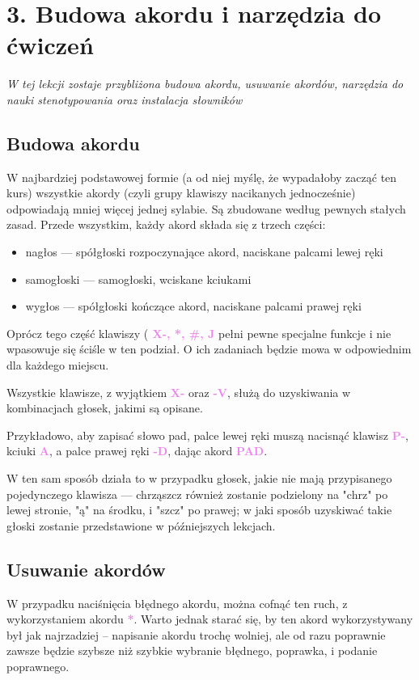 \documentclass[12p, oneside]{book}
\newcommand{\steno}[1]{\textbf{\textsf{\textcolor{violet}{ #1}}}}
\begin{document}
\section{3. Budowa akordu i narzędzia do ćwiczeń}

\emph{W tej lekcji zostaje przybliżona budowa akordu, usuwanie akordów, narzędzia do nauki stenotypowania oraz instalacja słowników}

\subsection*{Budowa akordu}
W najbardziej podstawowej formie (a od niej myślę, że wypadałoby zacząć ten kurs) wszystkie akordy (czyli grupy klawiszy nacikanych jednocześnie) odpowiadają mniej więcej jednej sylabie. Są zbudowane według pewnych stałych zasad. Przede wszystkim, każdy akord składa się z trzech części:
\begin{itemize}
	\item nagłos --- spółgłoski rozpoczynające akord, naciskane palcami lewej ręki
	\item samogłoski --- samogłoski, wciskane kciukami
	\item wygłos --- spółgłoski kończące akord, naciskane palcami prawej ręki
\end{itemize}
Oprócz tego część klawiszy (\steno{X-, *, \#, J} pełni pewne specjalne funkcje i nie wpasowuje się ściśle w ten podział. O ich zadaniach będzie mowa w odpowiednim dla każdego miejscu.

Wszystkie klawisze, z wyjątkiem \steno{X-} oraz \steno{-V}, służą do uzyskiwania w kombinacjach głosek, jakimi są opisane.

Przykładowo, aby zapisać słowo pad, palce lewej ręki muszą nacisnąć klawisz \steno{P-}, kciuki \steno{A}, a palce prawej ręki \steno{-D}, dając akord \steno{PAD}.

W ten sam sposób działa to w przypadku głosek, jakie nie mają przypisanego pojedynczego klawisza --- chrząszcz również zostanie podzielony na "chrz" po lewej stronie, "ą" na środku, i "szcz" po prawej; w jaki sposób uzyskiwać takie głoski zostanie przedstawione w późniejszych lekcjach.

\subsection*{Usuwanie akordów}

W przypadku naciśnięcia błędnego akordu, można cofnąć ten ruch, z wykorzystaniem akordu \steno{*}. Warto jednak starać się, by ten akord wykorzystywany był jak najrzadziej -- napisanie akordu trochę wolniej, ale od razu poprawnie zawsze będzie szybsze niż szybkie wybranie błędnego, poprawka, i podanie poprawnego.
\end{document}

